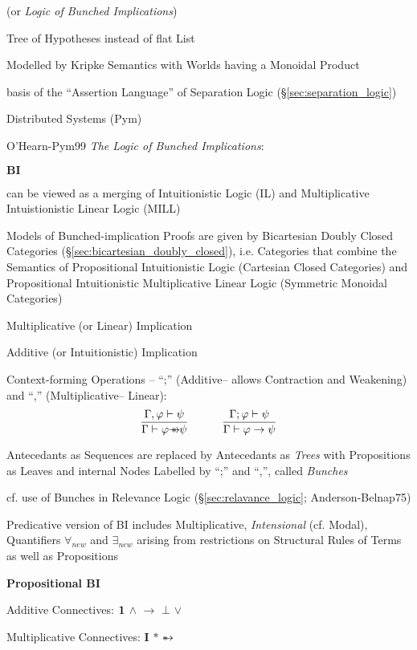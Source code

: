 \newcommand{\implmult}{\mathrlap{\rightarrow}*}
\renewcommand{\Id}{\mathbf{I}}

(or \emph{Logic of Bunched Implications})

Tree of Hypotheses instead of flat List

Modelled by Kripke Semantics with Worlds having a Monoidal Product

basis of the ``Assertion Language'' of Separation Logic
(\S\ref{sec:separation_logic})

Distributed Systems (Pym)

O'Hearn-Pym99 \emph{The Logic of Bunched Implications}:

$\textbf{BI}$

can be viewed as a merging of Intuitionistic Logic (IL) and
Multiplicative Intuistionistic Linear Logic (MILL)

Models of Bunched-implication Proofs are given by Bicartesian Doubly
Closed Categories (\S\ref{sec:bicartesian_doubly_closed}), i.e.
Categories that combine the Semantics of Propositional Intuitionistic
Logic (Cartesian Closed Categories) and Propositional Intuitionistic
Multiplicative Linear Logic (Symmetric Monoidal Categories)

Multiplicative (or Linear) Implication

Additive (or Intuitionistic) Implication

Context-forming Operations -- ``;'' (Additive-- allows Contraction and
Weakening) and ``,'' (Multiplicative-- Linear):
\[
  \frac{\Gamma,\varphi \vdash \psi}
    {\Gamma \vdash \varphi \implmult \psi}
  \quad\quad\quad
  \frac{\Gamma;\varphi \vdash \psi}
    {\Gamma \vdash \varphi \rightarrow \psi}
\]

Antecedants as Sequences are replaced by Antecedants as \emph{Trees}
with Propositions as Leaves and internal Nodes Labelled by ``;'' and
``,'', called \emph{Bunches}

cf. use of Bunches in Relevance Logic (\S\ref{sec:relavance_logic};
Anderson-Belnap75)

Predicative version of BI includes Multiplicative, \emph{Intensional}
(cf. Modal), Quantifiers $\forall_{new}$ and $\exists_{new}$ arising
from restrictions on Structural Rules of Terms as well as Propositions


\textbf{Propositional BI}

Additive Connectives: $\mathbf{1}$ $\wedge$ $\rightarrow$ $\bot$ $\vee$

Multiplicative Connectives: $\Id$ $*$ $\implmult$


